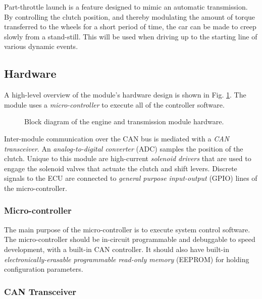 Part-throttle launch is a feature designed to mimic an automatic transmission. By controlling the clutch position, and thereby modulating the amount of torque transferred to the wheels for a short period of time, the car can be made to creep slowly from a stand-still. This will be used when driving up to the starting line of various dynamic events.

\subsection{Hardware \label{sec:design_engine_transmission_hardware}}

A high-level overview of the module's hardware design is shown in Fig. \ref{fig:engine_hardware_design_block}. The module uses a \emph{micro-controller} to execute all of the controller software. 

\begin{figure}[H]
	\centering
	
	\caption{Block diagram of the engine and transmission module hardware.}
	\label{fig:engine_hardware_design_block}
\end{figure}


Inter-module communication over the CAN bus is mediated with a \emph{CAN transceiver}. An \emph{analog-to-digital converter} (ADC) samples the position of the clutch. Unique to this module are high-current \emph{solenoid drivers} that are used to engage the solenoid valves that actuate the clutch and shift levers. Discrete signals to the ECU are connected to \emph{general purpose input-output} (GPIO) lines of the micro-controller.

\subsubsection{Micro-controller}


The main purpose of the micro-controller is to execute system control software. The micro-controller should be in-circuit programmable and debuggable to speed development, with a built-in CAN controller. It should also have built-in \emph{electronically-erasable programmable read-only memory} (EEPROM) for holding configuration parameters.

\subsubsection{CAN Transceiver}


